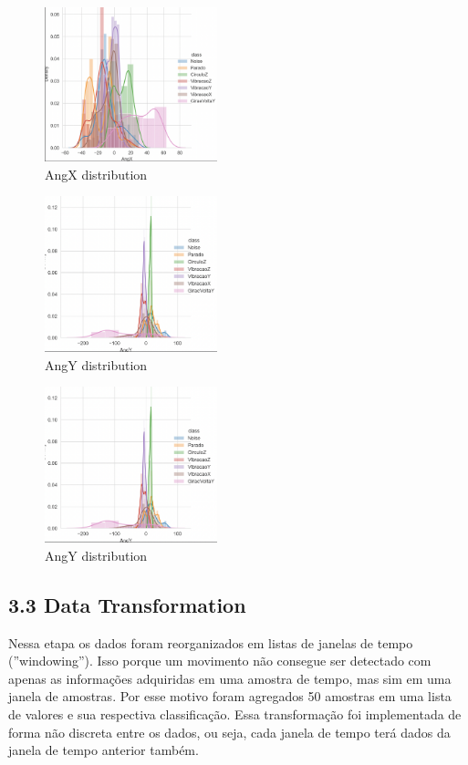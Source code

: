 \begin{figure}[H]
    \center
    \includegraphics[width=5cm]{images/AngXdistribution.png}
    \caption{ AngX distribution }
\end{figure}
\begin{figure}[H]
    \center
    \includegraphics[width=5cm]{images/AngYdistribution.png}
    \caption{ AngY distribution }
\end{figure}
\begin{figure}[H]
    \center
    \includegraphics[width=5cm]{images/AngYdistribution.png}
    \caption{ AngY distribution }
\end{figure}

\subsection*{3.3 Data Transformation}

Nessa etapa os dados foram reorganizados em listas de janelas de tempo (''windowing''). Isso porque um movimento não consegue ser
detectado com apenas as informações adquiridas em uma amostra de tempo, mas sim em uma janela de amostras.
Por esse motivo foram agregados 50 amostras em uma lista de valores e sua respectiva classificação. Essa transformação foi implementada de forma não discreta entre os dados,
ou seja, cada janela de tempo terá dados da janela de tempo anterior também.



